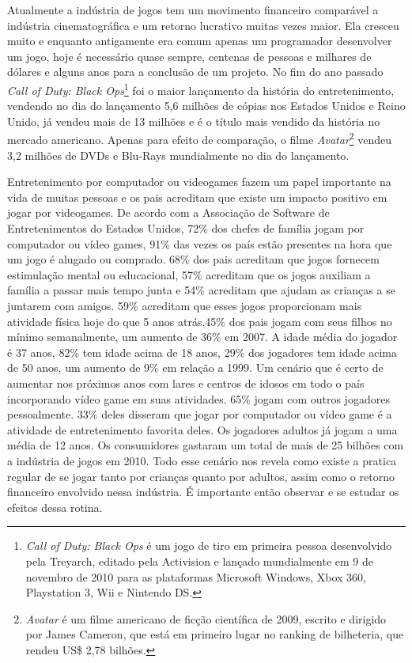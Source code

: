 Atualmente a indústria de jogos tem um movimento financeiro comparável a indústria cinematográfica e um retorno lucrativo muitas vezes maior.
Ela cresceu muito e enquanto antigamente era comum apenas um programador desenvolver um jogo, hoje é necessário quase sempre, centenas de pessoas e milhares de
dólares e alguns anos para a conclusão de um projeto. No fim do ano passado \textit{Call of Duty: Black Ops}\footnote{\textit{Call of Duty: Black Ops} é um jogo de
tiro em primeira pessoa desenvolvido pela Treyarch, editado pela Activision e lançado mundialmente em 9 de novembro de 2010 para as plataformas Microsoft Windows,
 Xbox 360, Playstation 3, Wii e Nintendo DS.} foi o maior lançamento da história do entretenimento,
vendendo no dia do lançamento 5,6 milhões de cópias nos Estados Unidos e Reino Unido, já vendeu mais de 13 milhões e é o título mais vendido da história no mercado
americano. Apenas para efeito de comparação, o filme \textit{Avatar}\footnote{\textit{Avatar} é um filme americano de ficção científica de 2009, escrito e dirigido
por James Cameron, que está em primeiro lugar no ranking de bilheteria, que rendeu US\$ 2,78 bilhões.} vendeu 3,2 milhões de DVDs e Blu-Rays mundialmente no dia do
 lançamento.\cite{TamanhoIndustriaGames}

Entretenimento por computador ou videogames fazem um papel importante na vida de muitas pessoas e os pais acreditam que existe um impacto positivo em jogar por videogames.
De acordo com a Associação de Software de Entretenimentos do Estados Unidos\cite{ESA}, 72\% dos chefes de família jogam por computador ou vídeo games,
91\% das vezes os país estão presentes na hora que um jogo é alugado ou comprado. 68\% dos pais acreditam que jogos fornecem estimulação mental ou educacional,
57\% acreditam que os jogos auxiliam a família a passar mais tempo junta e 54\% acreditam que ajudam as crianças a se juntarem com amigos. 59\% acreditam que esses
jogos proporcionam mais atividade física hoje do que 5 anos atrás.45\% dos pais jogam com seus filhos no mínimo semanalmente, um aumento de 36\% em 2007.
A idade média do jogador é 37 anos, 82\% tem idade acima de 18 anos, 29\% dos jogadores tem idade acima de 50 anos, um aumento de 9\% em relação a 1999.
Um cenário que é certo de aumentar nos próximos anos com lares e centros de idosos em todo o país incorporando vídeo game em suas atividades.
65\% jogam com outros jogadores pessoalmente. 33\% deles disseram que jogar por computador ou vídeo game é a atividade de entretenimento favorita deles.
Os jogadores adultos já jogam a uma média de 12 anos. Os consumidores gastaram um total de mais de 25 bilhões com a indústria de jogos em 2010.
Todo esse cenário nos revela como existe a pratica regular de se jogar tanto por crianças quanto por adultos, assim como o retorno financeiro envolvido nessa
indústria. É importante então observar e se estudar os efeitos dessa rotina.

